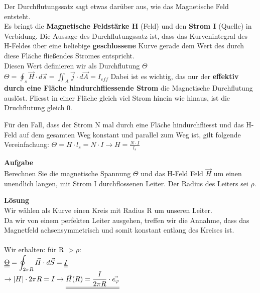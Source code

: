 	\begingl
	Der Durchflutungssatz sagt etwas darüber aus, wie das Magnetische Feld entsteht. \\
	 Es bringt die \textbf{Magnetische Feldstärke H} (Feld) und den \textbf{Strom I} (Quelle) in Verbidung.
	Die Aussage des Durchflutungssatz ist, dass das Kurvenintegral des H-Feldes über eine beliebige \textbf{geschlossene} Kurve gerade dem Wert des durch diese Fläche fließendes Stromes entspricht. \\
	Diesen Wert definieren wir als Durchflutung $\Theta$ \\
	\formulaBegin
	$\displaystyle \Theta = \oint_{s} \vec{H} \cdot d\vec{s} = \iint_{A} \vec{j} \cdot d\vec{A} = I_{eff}$
	\formulaEnd
	Dabei ist es wichtig, das nur der \textbf{effektiv durch eine Fläche hindurchfliessende Strom} die Magnetische Durchflutung auslöst. Fliesst in einer Fläche gleich viel Strom hinein wie hinaus, ist die Druchflutung gleich 0.
	\iend

	\begingl
	Für den Fall, dass der Strom N mal durch eine Fläche hindurchfliesst und das H-Feld auf dem gesamten Weg konstant und parallel zum Weg ist, gilt folgende Vereinfachung:
	\formulaBegin
	$\displaystyle \Theta = H \cdot l_s = N\cdot I \rightarrow H = \frac{N \cdot I}{l_s}$
	\formulaEnd
	\iend

	\beginbsp
	\textbf{Aufgabe} \\
	Berechnen Sie die magnetische Spannung $\Theta$ und das H-Feld Feld $\vec{H}$ um einen unendlich langen, mit Strom I durchflossenen Leiter. Der Radius des Leiters sei $\rho$. \\
	\iend

	\beginip
	\textbf{Lösung} \\

	Wir wählen als Kurve einen Kreis mit Radius R um unseren Leiter. \\
	Da wir von einem perfekten Leiter ausgehen, treffen wir die Annahme, dass das Magnetfeld achsensymmetrisch und somit konstant entlang des Kreises ist. \\
	\\
	Wir erhalten: für R $ > \rho$: \\
	$\displaystyle  \underline{\underline{\Theta}} =  \oint_{2\pi R} \vec{H} \cdot d\vec{S} = \underline{\underline{I}} $ \\
	$ \displaystyle \rightarrow |H| \cdot 2 \pi R = I \rightarrow \underline{\underline{\vec{H}(R) = \frac{I}{2 \pi R} \cdot \vec{e_{\varphi}}}} $\\

